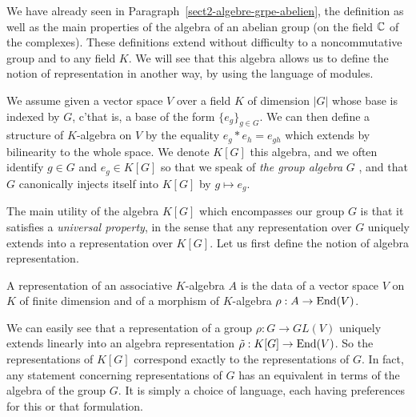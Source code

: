  
 
We have already seen in Paragraph~\ref{sect2-algebre-grpe-abelien}, the definition as well as the main properties of the algebra of an abelian group (on the field $ \mathbb{C} $ of the complexes). These definitions extend without difficulty to a noncommutative group and to any field $K$. We will see that this algebra allows us to define the notion of representation in another way, by using the language of modules.
 
\begin{defn}
\label{defn-algebra-group}
 \label{notation-71} We assume given a vector space $V$ over a field $K$ of dimension $ |G| $ whose base is indexed by $G$, c'that is, a base of the form $ \{e_g\}_{g \in G} $. We can then define a structure of $K$-algebra on $V$ by the equality $ e_g * e_h = e_{gh} $ which extends by bilinearity to the whole space. \label{notation-72} We denote $ K[G] $ this algebra, and we often identify $ g \in G $ and $ e_g \in K[G] $ so that we speak of \textit{the group algebra} $G$ , and that $G$ canonically injects itself into $ K[G] $ by $ g \mapsto e_g $.
\end{defn}
 The main utility of the algebra $ K[G] $ which encompasses our group $G$ is that it satisfies a \textit{universal property}, in the sense that any representation over $G$ uniquely extends into a representation over $ K[G] $. Let us first define the notion of algebra representation.
 
\begin{defn}
\label{defn-repr-algebre}
 A representation of an associative $K$-algebra $ A $ is the data of a vector space $V$ on $K$ of finite dimension and of a morphism of $K$-algebra $ \rho: A \rightarrow \operatorname{End}(V) $.
\end{defn}
We can easily see that a representation of a group $ \rho: G \rightarrow GL (V) $ uniquely extends linearly into an algebra representation $ \tilde{\rho}: K[G] \rightarrow \operatorname{End}(V) $. So the representations of $ K[G] $ correspond exactly to the representations of $G$. In fact, any statement concerning representations of $G$ has an equivalent in terms of the algebra of the group $G$. It is simply a choice of language, each having preferences for this or that formulation.
 
